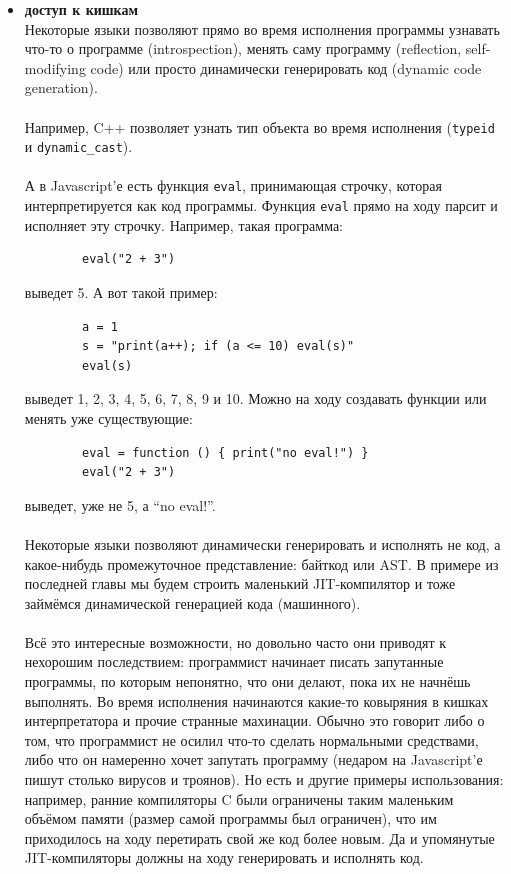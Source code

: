 \documentclass[11pt]{book}
\begin{document}
\begin{itemize}
\item \textbf{доступ к кишкам}
    \\
    Некоторые языки позволяют прямо во время исполнения программы
    узнавать что-то о программе (introspection),
    менять саму программу (reflection, self-modifying code)
    или просто динамически генерировать код (dynamic code generation).
    \\ \\
    Например, C++ позволяет узнать тип объекта во время исполнения (\texttt{typeid} и \texttt{dynamic\_cast}).
    \\ \\
    А в Javascript'е есть функция \texttt{eval}, принимающая строчку, которая интерпретируется как код программы.
    Функция \texttt{eval} прямо на ходу парсит и исполняет эту строчку.
    Например, такая программа:
    \begin{verbatim}
        eval("2 + 3")
    \end{verbatim}
    выведет 5. А вот такой пример:
    \begin{verbatim}
        a = 1
        s = "print(a++); if (a <= 10) eval(s)"
        eval(s)
    \end{verbatim}
    выведет 1, 2, 3, 4, 5, 6, 7, 8, 9 и 10.
    Можно на ходу создавать функции или менять уже существующие:
    \begin{verbatim}
        eval = function () { print("no eval!") }
        eval("2 + 3")
    \end{verbatim}
    выведет, уже не 5, а ``no eval!''.
    \\ \\
    Некоторые языки позволяют динамически генерировать и исполнять не код, а какое-нибудь промежуточное представление: байткод или AST.
    В примере из последней главы мы будем строить маленький JIT-компилятор
    и тоже займёмся динамической генерацией кода (машинного).
    \\ \\
    Всё это интересные возможности, но довольно часто они приводят к нехорошим последствием:
    программист начинает писать запутанные программы, по которым непонятно, что они делают, пока их не начнёшь выполнять.
    Во время исполнения начинаются какие-то ковыряния в кишках интерпретатора и прочие странные махинации.
    Обычно это говорит либо о том, что программист не осилил что-то сделать нормальными средствами,
    либо что он намеренно хочет запутать программу (недаром на Javascript'е пишут столько вирусов и троянов).
    Но есть и другие примеры использования: например, ранние компиляторы C были ограничены таким маленьким объёмом памяти
    (размер самой программы был ограничен), что им приходилось на ходу перетирать свой же код более новым.
    Да и упомянутые JIT-компиляторы должны на ходу генерировать и исполнять код.

\end{itemize}
\end{document}
